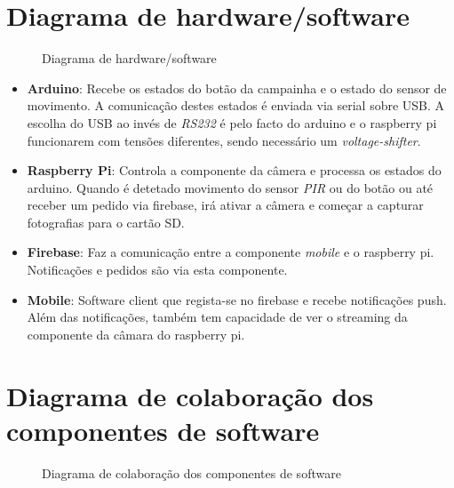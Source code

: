 \documentclass{article}
\begin{document}
\section{Diagrama de hardware/software}

    \begin{figure}[h!]
    \centering
    \caption{Diagrama de hardware/software}
    \label{fig:diaHardware}
\end{figure}

\begin{itemize}
    \item \textbf{Arduino}: Recebe os estados do botão da campainha e o estado do sensor de movimento. A comunicação destes estados é enviada via serial sobre USB. A escolha do USB ao invés de \textit{RS232} é pelo facto do arduino e o raspberry pi funcionarem com tensões diferentes, sendo necessário um \textit{voltage-shifter}.
    \item \textbf{Raspberry Pi}: Controla a componente da câmera e processa os estados do arduino. Quando é detetado movimento do sensor \textit{PIR} ou do botão ou até receber um pedido via firebase, irá ativar a câmera e começar a capturar fotografias para o cartão SD.
    \item \textbf{Firebase}: Faz a comunicação entre a componente \textit{mobile} e o raspberry pi. Notificações e pedidos são via esta componente.
    \item \textbf{Mobile}: Software client que regista-se no firebase e recebe notificações push. Além das notificações, também tem capacidade de ver o streaming da componente da câmara do raspberry pi.
\end{itemize}

\section{Diagrama de colaboração dos componentes de software}

\begin{figure}[h!]
    \centering
    \caption{Diagrama de colaboração dos componentes de software}
    \label{fig:diagGantt}
\end{figure}
\end{document}
